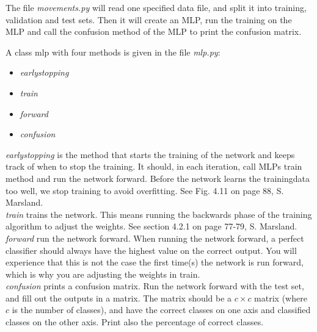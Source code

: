 The file \emph{movements.py} will read one specified data file, and split it into training, validation and test sets. Then it will create an MLP, run the training on the MLP and call the confusion method of the MLP to print the confusion matrix.

\noindent A class mlp with four methods is given in the file \emph{mlp.py}:

\begin{itemize}
\item \emph{earlystopping}
\item \emph{train}
\item \emph{forward}
\item \emph{confusion}
\end{itemize}

\noindent \emph{earlystopping} is the method that starts the training of the network and keeps track of when to stop the training. It should, in each iteration, call MLPs train method and run the network forward. Before the network learns the trainingdata too well, we stop training to avoid overfitting. See Fig. 4.11 on page 88, S. Marsland.\\

\noindent \emph{train} trains the network. This means running the backwards phase of the training algorithm to adjust the weights. See section 4.2.1 on page 77-79, S. Marsland.\\

\noindent \emph{forward} run the network forward. When running the network forward, a perfect classifier should always have the highest value on the correct output. You will experience that this is not the case the first time(s) the network is run forward, which is why you are adjusting the weights in train.\\

\noindent \emph{confusion} prints a confusion matrix. Run the network forward with the test set, and fill out the outputs in a matrix. The matrix should be a $c \times c$ matrix (where $c$ is the number of classes), and have the correct classes on one axis and classified classes on the other axis. Print also the percentage of correct classes.


